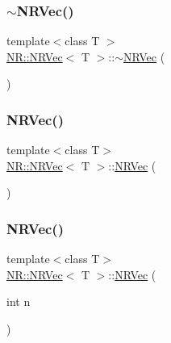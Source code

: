 \mbox{\label{classNR_1_1NRVec_a7161dfe4a95a73eca56d084c662f8eae}} 
\subsubsection{\texorpdfstring{$\sim$NRVec()}{~NRVec()}\hspace{0.1cm}{\footnotesize\ttfamily [1/3]}}
{\footnotesize\ttfamily template$<$class T $>$ \\
\mbox{\hyperlink{classNR_1_1NRVec}{N\+R\+::\+N\+R\+Vec}}$<$ T $>$\+::$\sim$\mbox{\hyperlink{classNR_1_1NRVec}{N\+R\+Vec}} (\begin{DoxyParamCaption}{ }\end{DoxyParamCaption})}

\mbox{\label{classNR_1_1NRVec_a3c549533b11738d9c1320abd0078f5aa}} 
\subsubsection{\texorpdfstring{NRVec()}{NRVec()}\hspace{0.1cm}{\footnotesize\ttfamily [6/15]}}
{\footnotesize\ttfamily template$<$class T$>$ \\
\mbox{\hyperlink{classNR_1_1NRVec}{N\+R\+::\+N\+R\+Vec}}$<$ T $>$\+::\mbox{\hyperlink{classNR_1_1NRVec}{N\+R\+Vec}} (\begin{DoxyParamCaption}{ }\end{DoxyParamCaption})}

\mbox{\label{classNR_1_1NRVec_a32e1c3a7b161ae48f90e95f44261c385}} 
\subsubsection{\texorpdfstring{NRVec()}{NRVec()}\hspace{0.1cm}{\footnotesize\ttfamily [7/15]}}
{\footnotesize\ttfamily template$<$class T$>$ \\
\mbox{\hyperlink{classNR_1_1NRVec}{N\+R\+::\+N\+R\+Vec}}$<$ T $>$\+::\mbox{\hyperlink{classNR_1_1NRVec}{N\+R\+Vec}} (\begin{DoxyParamCaption}\item[{int}]{n }\end{DoxyParamCaption})\hspace{0.3cm}{\ttfamily [explicit]}}

